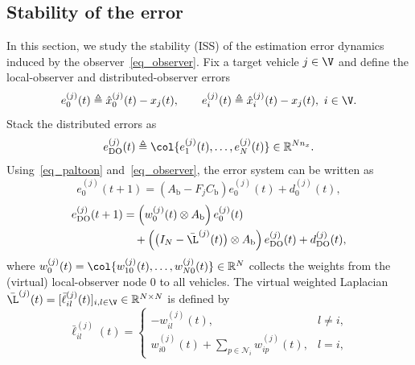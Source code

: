 \vspace*{-0.1cm}
\subsection{Stability of the error}\label{subsec_Prove}
\vspace*{-0.2cm}
In this section, we study the stability (ISS) of the estimation error dynamics induced by the observer~\eqref{eq_observer}.
Fix a target vehicle $j\in\V$ and define the local-observer and distributed-observer errors
\begin{equation}\label{eq:def_errors}
e_0^{(j)}(t)\triangleq \hat{x}_0^{(j)}(t)-x_j(t),\qquad
e_i^{(j)}(t)\triangleq \hat{x}_i^{(j)}(t)-x_j(t),\ i\in\V.
\end{equation}
Stack the distributed errors as
\begin{equation}\label{eq:def_eDO}
e_{\mathrm{DO}}^{(j)}(t)\triangleq \col{e_1^{(j)}(t),\ldots,e_N^{(j)}(t)}\in\mathbb{R}^{Nn_x}.
\end{equation}
Using~\eqref{eq_paltoon} and~\eqref{eq_observer}, the error system can be written as
\begin{equation}\label{eq_e0}
e_0^{(j)}(t+1)=\left(A_{\text{b}}-F_jC_{\text{b}}\right)e_0^{(j)}(t)+d_0^{(j)}(t),
\end{equation}
\begin{align}\label{eq_error}
\small
e_{\mathrm{DO}}^{(j)}(t+1)
&=\Big(w_{0}^{(j)}(t)\otimes A_{\text{b}}\Big)\,e_0^{(j)}(t) \notag\\
&\quad+\Big(\big(I_{N}-\bar{\L}^{(j)}(t)\big)\otimes A_{\text{b}}\Big)\,e_{\mathrm{DO}}^{(j)}(t)
+d_{\mathrm{DO}}^{(j)}(t),
\end{align}
where $w_{0}^{(j)}(t)=\col{w_{10}^{(j)}(t),\ldots,w_{N0}^{(j)}(t)}\in\mathbb{R}^{N}$ collects the weights from the (virtual) local-observer node $0$ to all vehicles.
The virtual weighted Laplacian $\bar{\L}^{(j)}(t)=[\bar{\ell}^{(j)}_{il}(t)]_{i,l\in\V}\in\mathbb{R}^{N\times N}$ is defined by
\begin{equation}\label{eq:def_Lbar}
\bar{\ell}^{(j)}_{il}(t)=
\begin{cases}
-w_{il}^{(j)}(t), & l\neq i,\\[0.5ex]
 w_{i0}^{(j)}(t)+\displaystyle\sum_{p\in\mathcal{N}_i} w_{ip}^{(j)}(t), & l=i,
\end{cases}
\end{equation}

